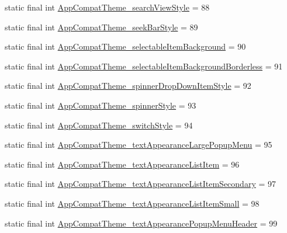 \begin{DoxyCompactItemize}
\item 
static final int \mbox{\hyperlink{classandroid_1_1support_1_1design_1_1R_1_1styleable_a2337ef5894fe6bee67c747709a656df8}{App\+Compat\+Theme\+\_\+search\+View\+Style}} = 88
\item 
static final int \mbox{\hyperlink{classandroid_1_1support_1_1design_1_1R_1_1styleable_a4744a84db621d695271362701ee808d2}{App\+Compat\+Theme\+\_\+seek\+Bar\+Style}} = 89
\item 
static final int \mbox{\hyperlink{classandroid_1_1support_1_1design_1_1R_1_1styleable_a8db61c7d24d29815158068e748d36b77}{App\+Compat\+Theme\+\_\+selectable\+Item\+Background}} = 90
\item 
static final int \mbox{\hyperlink{classandroid_1_1support_1_1design_1_1R_1_1styleable_ac2dc2f43f68e02bd349adaaef7248181}{App\+Compat\+Theme\+\_\+selectable\+Item\+Background\+Borderless}} = 91
\item 
static final int \mbox{\hyperlink{classandroid_1_1support_1_1design_1_1R_1_1styleable_a2aec6ade4ae94164a4ed938809d6193a}{App\+Compat\+Theme\+\_\+spinner\+Drop\+Down\+Item\+Style}} = 92
\item 
static final int \mbox{\hyperlink{classandroid_1_1support_1_1design_1_1R_1_1styleable_aa3c3a41a91ab59cdfcb27c08c9481bf9}{App\+Compat\+Theme\+\_\+spinner\+Style}} = 93
\item 
static final int \mbox{\hyperlink{classandroid_1_1support_1_1design_1_1R_1_1styleable_a5a94f43c80174711f145800235c41f96}{App\+Compat\+Theme\+\_\+switch\+Style}} = 94
\item 
static final int \mbox{\hyperlink{classandroid_1_1support_1_1design_1_1R_1_1styleable_a1636a118070d64a095e1298adcaa6bf5}{App\+Compat\+Theme\+\_\+text\+Appearance\+Large\+Popup\+Menu}} = 95
\item 
static final int \mbox{\hyperlink{classandroid_1_1support_1_1design_1_1R_1_1styleable_a5d1d6972dd1ae78bc1c4f5323d531648}{App\+Compat\+Theme\+\_\+text\+Appearance\+List\+Item}} = 96
\item 
static final int \mbox{\hyperlink{classandroid_1_1support_1_1design_1_1R_1_1styleable_ad0a32a60579b4e2c4ad18aab20436246}{App\+Compat\+Theme\+\_\+text\+Appearance\+List\+Item\+Secondary}} = 97
\item 
static final int \mbox{\hyperlink{classandroid_1_1support_1_1design_1_1R_1_1styleable_a7c4f1b5ec2a28ae949857c9fa797a276}{App\+Compat\+Theme\+\_\+text\+Appearance\+List\+Item\+Small}} = 98
\item 
static final int \mbox{\hyperlink{classandroid_1_1support_1_1design_1_1R_1_1styleable_addc358699df35f00e24791fcf5f26807}{App\+Compat\+Theme\+\_\+text\+Appearance\+Popup\+Menu\+Header}} = 99

\end{DoxyCompactItemize}
